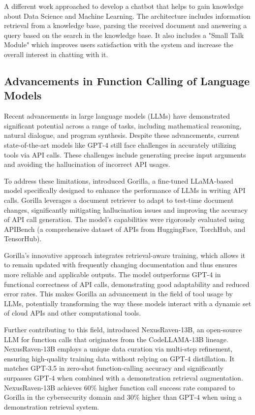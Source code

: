 A different work \cite{carlander-reuterfelt_jaicob_2020} approached to develop a chatbot that helps to gain knowledge about Data Science and Machine Learning.
The architecture includes information retrieval from a knowledge base, parsing the received document and answering a query based on the search in the knowledge base.
It also includes a "Small Talk Module" which improves users satisfaction with the system and increase the overall interest in chatting with it.

\subsection{Advancements in Function Calling of Language Models}

Recent advancements in large language models (LLMs) have demonstrated significant potential across a range of tasks, including mathematical reasoning, natural dialogue, and program synthesis. Despite these advancements, current state-of-the-art models like GPT-4 still face challenges in accurately utilizing tools via API calls. These challenges include generating precise input arguments and avoiding the hallucination of incorrect API usages.

To address these limitations, \citet{patil2023gorillalargelanguagemodel} introduced Gorilla, a fine-tuned LLaMA-based model specifically designed to enhance the performance of LLMs in writing API calls. Gorilla leverages a document retriever to adapt to test-time document changes, significantly mitigating hallucination issues and improving the accuracy of API call generation. The model's capabilities were rigorously evaluated using APIBench (a comprehensive dataset of APIs from HuggingFace, TorchHub, and TensorHub).

Gorilla's innovative approach integrates retrieval-aware training, which allows it to remain updated with frequently changing documentation and thus ensures more reliable and applicable outputs. The model outperforms GPT-4 in functional correctness of API calls, demonstrating good adaptability and reduced error rates. This makes Gorilla an advancement in the field of tool usage by LLMs, potentially transforming the way these models interact with a dynamic set of cloud APIs and other computational tools.

Further contributing to this field, \citet{srinivasan2023nexusraven} introduced NexusRaven-13B, an open-source LLM for function calls that originates from the CodeLLAMA-13B lineage. NexusRaven-13B employs a unique data curation via multi-step refinement, ensuring high-quality training data without relying on GPT-4 distillation. It matches GPT-3.5 in zero-shot function-calling accuracy and significantly surpasses GPT-4 when combined with a demonstration retrieval augmentation. NexusRaven-13B achieves 60\% higher function call success rate compared to Gorilla in the cybersecurity domain and 30\% higher than GPT-4 when using a demonstration retrieval system.

